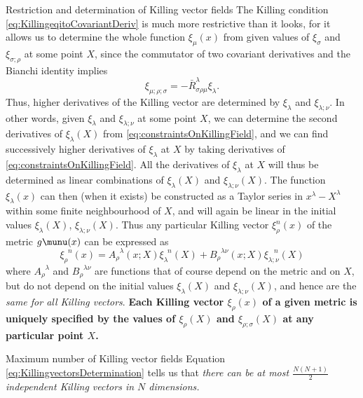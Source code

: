 \begin{mybox}{Restriction and determination of Killing vector fields}
	The Killing condition \ref{eq:KillingeqitoCovariantDeriv} is much more restrictive than it looks, for it allows us to determine the whole function $\xi_\mu(x)$ from given values of $\xi_\sigma$ and $\xi_{\sigma ;\rho}$ at some point $X$, since the commutator of two covariant derivatives and the Bianchi identity implies
	\begin{equation}
	\label{eq:constraintsOnKillingField}
		\xi_{\mu;\rho;\sigma} = - \bar{R}^\lambda_{\sigma \rho \mu} \xi_\lambda.
	\end{equation}
	Thus, higher derivatives of the Killing vector are determined by $\xi_\lambda$ and $\xi_{\lambda;\nu}$. In other words, given $\xi_\lambda$ and $\xi_{\lambda;\nu}$ at some point $X$, we can determine the second derivatives of $\xi_\lambda(X)$ from \ref{eq:constraintsOnKillingField}, and we can find successively higher derivatives of $\xi_\lambda$ at $X$ by taking derivatives of \ref{eq:constraintsOnKillingField}. All the derivatives of $\xi_\lambda$ at $X$ will thus be determined as linear combinations of $\xi_\lambda(X)$ and $\xi_{\lambda;\nu}(X)$. The function $\xi_\lambda(x)$ can then (when it exists) be constructed as a Taylor series in $x^\lambda - X^\lambda$ within some finite neighbourhood of $X$, and will again be linear in the initial values $\xi_\lambda(X)$, $ \xi_{\lambda;\nu}(X)$. Thus any particular Killing vector $\xi^n_\rho(x)$ of the metric $g\munu(x)$ can be expressed as
	\begin{equation}
	\label{eq:KillingvectorsDetermination}
	\xi^{\;\;n}_\rho(x) = A^{\;\;\lambda}_\rho(x; X) \xi^{\;\;n}_\lambda (X) + B^{\;\; \lambda \nu}_\rho (x; X) \xi^{\;\;\; n}_{\lambda ;\nu} (X)
	\end{equation}
	where $A^{\;\;\lambda}_\rho$ and $B^{\;\;\lambda \nu}_\rho$ are functions that of course depend on the metric and on $X$, but do not depend on the initial values $\xi_\lambda(X)$ and $\xi_{\lambda;\nu}(X)$, and hence are the \emph{same for all Killing vectors}. \textbf{Each Killing vector $\xi_\rho(x)$ of a given metric is uniquely specified by the values of $\xi_\rho(X)$ and $\xi_{\rho ; \sigma}(X)$ at any particular point $X$.}
\end{mybox}
\begin{mybox}{Maximum number of Killing vector fields}
	Equation \ref{eq:KillingvectorsDetermination} tells us that \emph{there can be at most $\frac{N(N+1)}{2}$ independent Killing vectors in $N$ dimensions.}
\end{mybox}

